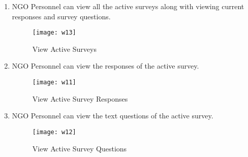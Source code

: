 \begin{enumerate}
\item NGO Personnel can view all the active surveys along with viewing current responses and survey questions.
\begin{figure}[here]
\begin{center}   
\texttt{[image: w13]}
\caption{View Active Surveys}
\label{fig:w13}
\end{center}
\end{figure}


\item NGO Personnel can view the responses of the active survey.
\begin{figure}[here]
\begin{center}   
\texttt{[image: w11]}
\caption{View Active Survey Responses}
\label{fig:w11}
\end{center}
\end{figure}


\item NGO Personnel can view the text questions of the active survey.
\begin{figure}[here]
\begin{center}   
\texttt{[image: w12]}
\caption{View Active Survey Questions}
\label{fig:w12}
\end{center}
\end{figure}
 
\end{enumerate}
